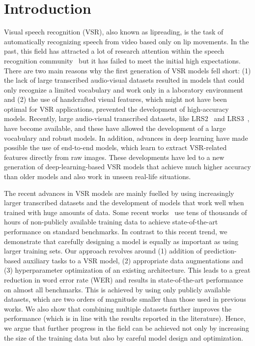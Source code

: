 \documentclass[twocolumn]{article}
\begin{document}
\section{Introduction}
Visual speech recognition (VSR), also known as lipreading, is the task of automatically recognizing speech from video based only on lip movements. In the past, this field has attracted a lot of research attention within the speech recognition community~\cite{DBLP:journals/pieee/PotamianosNGGS03,DBLP:journals/tmm/DupontL00} but it has failed to meet the initial high expectations. There are two main reasons why the first generation of VSR models fell short: (1) the lack of large transcribed audio-visual datasets resulted in models that could only recognize a limited vocabulary and work only in a laboratory environment and (2) the use of handcrafted visual features, which might not have been optimal for VSR applications, prevented the development of high-accuracy models. Recently, large audio-visual transcribed datasets, like LRS2~\cite{chung2017lip} and LRS3~\cite{afouras2018deep}, have become available, and these have allowed the development of a large vocabulary and robust models. In addition, advances in deep learning have made possible the use of end-to-end models, which learn to extract VSR-related features directly from raw images. These developments have led to a new generation of deep-learning-based VSR models that achieve much higher accuracy than older models and also work in unseen real-life situations.

The recent advances in VSR models are mainly fuelled by using increasingly larger transcribed datasets and the development of models that work well when trained with huge amounts of data. Some recent works~\cite{shillingford2019large, serdyuk2021audiovisual} use tens of thousands of hours of non-publicly available training data to achieve state-of-the-art performance on standard benchmarks. In contrast to this recent trend, we demonstrate that carefully designing a model is equally as important as using larger training sets. Our approach revolves around (1) addition of prediction-based auxiliary tasks to a VSR model, (2) appropriate data augmentations and (3) hyperparameter optimization of an existing architecture. This leads to a great reduction in word error rate (WER) and results in state-of-the-art performance on almost all benchmarks. This is achieved by using only publicly available datasets, which are two orders of magnitude smaller than those used in previous works. We also show that combining multiple datasets further improves the performance (which is in line with the results reported in the literature). Hence, we argue that further progress in the field can be achieved not only by increasing the size of the training data but also by careful model design and optimization.       
\end{document}
